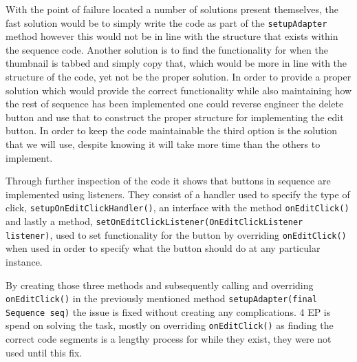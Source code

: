 With the point of failure located a number of solutions present themselves, the fast solution would be to simply write the code as part of the \texttt{setupAdapter} method however this would not be in line with the structure that exists within the sequence code.
Another solution is to find the functionality for when the thumbnail is tabbed and simply copy that, which would be more in line with the structure of the code, yet not be the proper solution.
In order to provide a proper solution which would provide the correct functionality while also maintaining how the rest of sequence has been implemented one could reverse engineer the delete button and use that to construct the proper structure for implementing the edit button.
In order to keep the code maintainable the third option is the solution that we will use, despite knowing it will take more time than the others to implement.

Through further inspection of the code it shows that buttons in sequence are implemented using listeners.
They consist of a handler used to specify the type of click, \texttt{setupOnEditClickHandler()}, an interface with the method \texttt{onEditClick()} and lastly a method, \texttt{setOnEditClickListener(OnEditClickListener listener)}, used to set functionality for the button by overriding \texttt{onEditClick()} when used in order to specify what the button should do at any particular instance.

By creating those three methods and subsequently calling and overriding \texttt{onEditClick()} in the previously mentioned method \texttt{setupAdapter(final Sequence seq)} the issue is fixed without creating any complications.
4 EP is spend on solving the task, mostly on overriding \texttt{onEditClick()} as finding the correct code segments is a lengthy process for while they exist, they were not used until this fix.